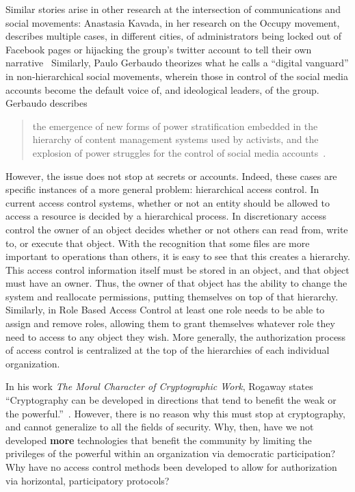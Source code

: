 Similar stories arise in other research at the intersection of communications
and social movements: Anastasia Kavada, in her research on the Occupy movement,
describes multiple cases, in different cities, of administrators being locked
out of Facebook pages or hijacking the group’s twitter account to tell their own
narrative~\cite{kavada2015creating} Similarly, Paulo Gerbaudo theorizes what he
calls a ``digital vanguard'' in non-hierarchical social movements, wherein those
in control of the social media accounts become the default voice of, and
ideological leaders, of the group. Gerbaudo describes 

\begin{quote}
the emergence of new forms of power stratification embedded in the hierarchy
of content management systems used by activists, and the explosion of power
struggles for the control of social media accounts~\cite{gerbaudo2017social}.
\end{quote}

However, the issue does not stop at secrets or accounts. Indeed, these cases are
specific instances of a more general problem: hierarchical access control. In
current access control systems, whether or not an entity should be allowed to
access a resource is decided by a hierarchical process. In discretionary access
control the owner of an object decides whether or not others can read from,
write to, or execute that object. With the recognition that some files are more
important to operations than others, it is easy to see that this creates a
hierarchy. This access control information itself must be stored in an object,
and that object must have an owner. Thus, the owner of that object has the
ability to change the system and reallocate permissions, putting themselves on
top of that hierarchy. Similarly, in Role Based Access Control at least one role
needs to be able to assign and remove roles, allowing them to grant themselves
whatever role they need to access to any object they wish. More generally, the
authorization process of access control is centralized at the top of the
hierarchies of each individual organization.

In his work \textit{The Moral Character of Cryptographic Work}, Rogaway states
``Cryptography can be developed in directions that tend to benefit the weak or
the powerful.''~\cite{rogaway2015moral}. However, there is no reason why this
must stop at cryptography, and cannot generalize to all the fields of security.
Why, then, have we not developed \textbf{more} technologies that benefit the
community by limiting the privileges of the powerful within an organization via
democratic participation? Why have no access control methods been developed to
allow for authorization via horizontal, participatory protocols?

